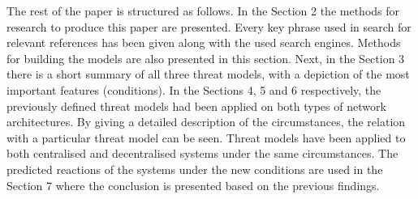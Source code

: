The rest of the paper is structured as follows. In the Section 2 the methods for research to produce this paper are presented. Every key phrase used in search for relevant references has been given along with the used search engines. Methods for building the models are also presented in this section. Next, in the Section 3 there is a short summary of all three threat models, with a depiction of the most important features (conditions). In the Sections 4, 5 and 6 respectively, the previously defined threat models had been applied on both types of network architectures. By giving a detailed description of the circumstances, the relation with a particular threat model can be seen. Threat models have been applied to both centralised and decentralised systems under the same circumstances. The predicted reactions of the systems under the new conditions are used in the Section 7 where the conclusion is presented based on the previous findings.
